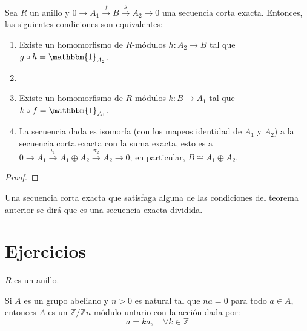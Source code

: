 \documentclass[12pt]{report}
\newcounter{it}
\theoremstyle{largebreak}
\newcommand\cf[3]{\ensuremath{#1:#2\rightarrow#3}}
\newcommand{\bbm}[1]{\mathbbm{#1}}
\begin{document}
    \begin{theor}
        Sea $R$ un anillo y $0\rightarrow A_1\overset{f}{\rightarrow}B\overset{g}{\rightarrow}A_2\rightarrow0$ una secuencia corta exacta. Entonces, las siguientes condiciones son equivalentes:
        \begin{enumerate}[label = \textit{(\arabic*)}]
            \item Existe un homomorfismo de $R$-módulos $\cf{h}{A_2}{B}$ tal que $g\circ h=\bbm{1}_{ A_2}$.
            \item \item Existe un homomorfismo de $R$-módulos $\cf{k}{B}{A_1}$ tal que $k\circ f=\bbm{1}_{ A_1}$.
            \item La secuencia dada es isomorfa (con los mapeos identidad de $A_1$ y $A_2$) a la secuencia corta exacta con la suma exacta, esto es a $0\rightarrow A_1\overset{\iota_1}{\rightarrow}A_1\oplus A_2 \overset{\pi_2}{\rightarrow}A_2\rightarrow0$; en particular, $B\cong A_1\oplus A_2$.
        \end{enumerate}
    \end{theor}

    \begin{proof}
        
    \end{proof}

    \begin{mydef}
        Una secuencia corta exacta que satisfaga alguna de las condiciones del teorema anterior se dirá que es una secuencia exacta dividida.
    \end{mydef}

    \newpage

    \section{Ejercicios}

    \begin{obs}
        $R$ es un anillo.
    \end{obs}

    \begin{excer}
        Si $A$ es un grupo abeliano y $n>0$ es natural tal que $na=0$ para todo $a\in A$, entonces $A$ es un $\mathbb{Z}/\mathbb{Z}n$-módulo untario con la acción dada por:
        \begin{equation*}
            [k]a=ka,\quad\forall k\in\mathbb{Z}
        \end{equation*}
    \end{excer}
\end{document}
